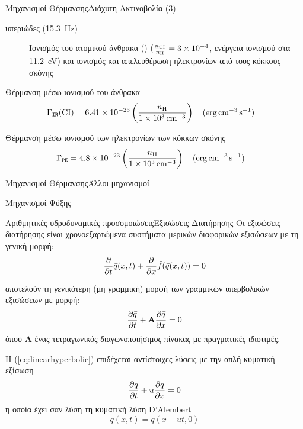 \documentclass{beamer}
\begin{document}
\begin{frame}{Μηχανισμοί Θέρμανσης}{Διάχυτη Ακτινοβολία (3)}
	\begin{description}
		\item[υπεριώδες (\SI{15.3}{Hz})]{Ιονισμός του ατομικού άνθρακα () ($\frac{n_{\ce{CI}}}{n_{\ce{H}}} =\num{3e-4}$, ενέργεια ιονισμού στα \SI{11.2}{eV}) και ιονισμός και απελευθέρωση ηλεκτρονίων από τους κόκκους σκόνης}
		\end{description}
		\begin{block}{Θέρμανση μέσω ιονισμού του άνθρακα}
			  \begin{equation}
			\Gamma _\mathtt{IR} (\ce{CI}) = \num{6.41e-23} \left( \frac{n_{\ce{H}}}{\SI{1e3}{cm^{-3}}} \right) \qq{(\si{erg.cm^{-3}.s^{-1}})} 
			\end{equation}
		\end{block}	
			\begin{block}{Θέρμανση μέσω ιονισμού των ηλεκτρονίων των κόκκων σκόνης}
\begin{equation}
\Gamma _\mathtt{PE} = \num{4.8e-23} \left( \frac{n_{\ce{H}}}{\SI{1e3}{cm^{-3}}} \right) \qq{(\si{erg.cm^{-3}.s^{-1}})} 
\end{equation}
	\end{block}	
\end{frame}

\begin{frame}{Μηχανισμοί Θέρμανσης}{Άλλοι μηχανισμοί}
	
\end{frame}

\begin{frame}{Μηχανισμοί Ψύξης}%
	
\end{frame}

\begin{frame}{Αριθμητικές υδροδυναμικές προσομοιώσεις}{Εξισώσεις Διατήρησης}
	Οι εξισώσεις διατήρησης είναι χρονοεξαρτώμενα συστήματα μερικών διαφορικών εξισώσεων με τη γενική μορφή:
	\begin{equation}
	\label{eq:hyperbolicconservation}
	\pdv{t} \bar{q}(x,t) + \pdv{x} \bar{f}(\bar{q}(x,t)) = 0 
	\end{equation}
	
	αποτελούν τη γενικότερη (μη γραμμική) μορφή των γραμμικών υπερβολικών εξισώσεων με μορφή:
	\begin{equation}
	\label{eq:linearhyperbolic}
	\pdv{\bar{q}}{t} +  \mathbf{A}\pdv{\bar{q}}{x}  = 0 
	\end{equation}
	όπου $\mathbf{A}$ ένας τετραγωνικός διαγωνοποιήσιμος πίνακας με πραγματικές ιδιοτιμές.
	
Η (\ref{eq:linearhyperbolic}) επιδέχεται αντίστοιχες λύσεις με την απλή κυματική εξίσωση
	\begin{equation}
	\label{eq:simple_advection}
	\pdv{q}{t} +  u\pdv{q}{x}  = 0 
	\end{equation}
	η οποία έχει σαν λύση τη κυματική λύση D'Alembert
	\begin{equation}
	q(x,t)=q(x-ut,0)
	\end{equation}
\end{frame}
\end{document}
